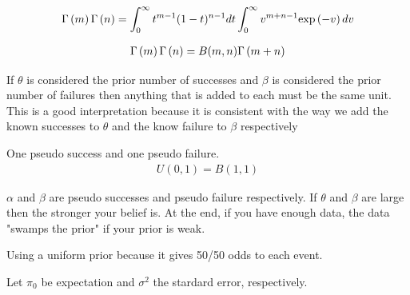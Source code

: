 \documentclass[12pt]{article}
\begin{document}
\begin{enumerate}
\begin{align*}
    \Gamma\left(m\right)\Gamma\left(n\right) =  \int_{0}^{\infty} t^{m-1}(1-t)^{n-1}d t  \int_{0}^{\infty}v^{m+n-1}\mathrm{exp}\left(-v\right)d v
\end{align*}

\begin{align*}
    \Gamma\left(m\right)\Gamma\left(n\right) = B(m,n)\Gamma\left(m+n\right)
\end{align*}





If $\theta$ is considered the prior number of successes and $\beta$ is considered the prior number of failures then anything that is added to each must be the same unit. This is a good interpretation because it is consistent with the way we add the known successes to $\theta$ and the know failure to $\beta$ respectively



One pseudo success and one pseudo failure. 
\begin{align*}
    U(0,1) = B(1,1)
\end{align*}


$\alpha$ and $\beta$ are pseudo successes and pseudo failure respectively. If $\theta$ and $\beta$ are large then the stronger your belief is. At the end, if you have enough data, the data "swamps the prior" if your prior is weak. 


Using a uniform prior because it gives 50/50 odds to each event.


Let $\pi_0$ be expectation and $\sigma^2$ the stardard error, respectively. 


\end{enumerate}
\end{document}
